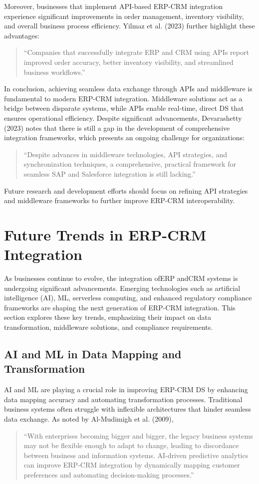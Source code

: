 Moreover, businesses that implement API-based ERP-CRM integration experience significant improvements in order management, inventory visibility, and overall business process efficiency. Yilmaz et al. (2023) further highlight these advantages:
\begin{quote}
    ``Companies that successfully integrate ERP and CRM using APIs report improved order accuracy, better inventory visibility, and streamlined business workflows.'' \cite{yilmaz2023}
\end{quote}

In conclusion, achieving seamless data exchange through APIs and middleware is fundamental to modern ERP-CRM integration. Middleware solutions act as a bridge between disparate systems, while APIs enable real-time, direct DS that ensures operational efficiency. Despite significant advancements, Devarashetty (2023) notes that there is still a gap in the development of comprehensive integration frameworks, which presents an ongoing challenge for organizations:
\begin{quote}
    ``Despite advances in middleware technologies, API strategies, and synchronization techniques, a comprehensive, practical framework for seamless SAP and Salesforce integration is still lacking.'' \cite{devarashetty2023}
\end{quote}
Future research and development efforts should focus on refining API strategies and middleware frameworks to further improve ERP-CRM interoperability.


\section{Future Trends in ERP-CRM Integration}

As businesses continue to evolve, the integration ofERP andCRM systems is undergoing significant advancements. Emerging technologies such as artificial intelligence (AI), ML, serverless computing, and enhanced regulatory compliance frameworks are shaping the next generation of ERP-CRM integration. This section explores these key trends, emphasizing their impact on data transformation, middleware solutions, and compliance requirements.

\subsection{AI and ML in Data Mapping and Transformation}

AI and ML are playing a crucial role in improving ERP-CRM DS by enhancing data mapping accuracy and automating transformation processes. Traditional business systems often struggle with inflexible architectures that hinder seamless data exchange. As noted by Al-Mudimigh et al. (2009), 
\begin{quote}
    ``With enterprises becoming bigger and bigger, the legacy business systems may not be flexible enough to adapt to change, leading to discordance between business and information systems. AI-driven predictive analytics can improve ERP-CRM integration by dynamically mapping customer preferences and automating decision-making processes.'' \cite{almudimigh2009}
\end{quote}

